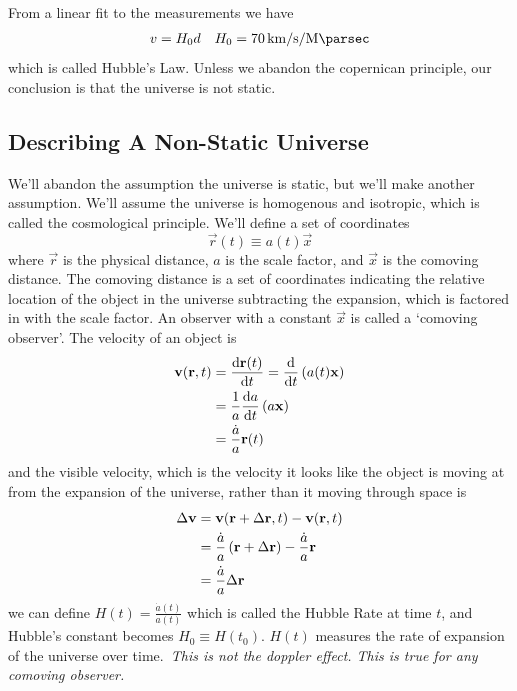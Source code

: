 From a linear fit to the measurements we have
\begin{align}
  v = H_0 d  && H_0 = \qty{70}{\kilo\meter\per\second\per\mega\parsec}
\end{align}
which is called Hubble's Law. Unless we abandon the copernican principle, our conclusion is that the universe is not static.
\subsection{Describing A Non-Static Universe}
We'll abandon the assumption the universe is static, but we'll make another assumption. We'll assume the universe is homogenous and isotropic, which is called the cosmological principle. We'll define a set of coordinates
\begin{equation}
  \vec{r}(t) \equiv a(t)\vec{x}
\end{equation}
where \(\vec{r}\) is the physical distance, \(a\) is the scale factor, and \(\vec{x}\) is the comoving distance. The comoving distance is a set of coordinates indicating the relative location of the object in the universe subtracting the expansion, which is factored in with the scale factor. An observer with a constant \(\vec{x}\) is called a `comoving observer'. The velocity of an object is
\begin{align}
  \vec{v}(\vec{r},t) &= \diff{\vec{r}(t)}{t} = \diff*{\ins{a(t)\vec{x}}}{t} \\
  &= \frac{1}{a}\diff{a}{t}\ins{a\vec{x}}\\
  &= \frac{\dot a}{a}\vec{r}(t)
\end{align}
and the visible velocity, which is the velocity it looks like the object is moving at from the expansion of the universe, rather than it moving through space is
\begin{align}
  \Delta \mathbf{v} &= \mathbf{v}(\mathbf{r}+\Delta\mathbf{r},t)-\mathbf{v}(\mathbf{r},t) \\
  &= \frac{\dot a}{a}\left(\mathbf{r}+\Delta\mathbf{r}\right)-\frac{\dot a}{a}\mathbf{r} \\
  &= \frac{\dot a}{a}\Delta\mathbf{r}
\end{align}
we can define \(H(t) = \frac{\dot a(t)}{a(t)}\) which is called the Hubble Rate at time \(t\), and Hubble's constant becomes \(H_0 \equiv H(t_0)\). \(H(t)\) measures the rate of expansion of the universe over time.\ \emph{This is not the doppler effect. This is true for any comoving observer.}
